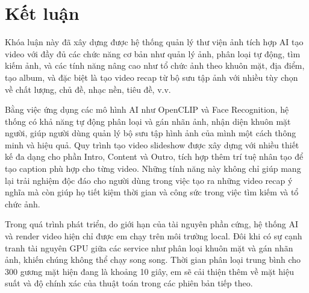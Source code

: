 \chapter*{Kết luận}

Khóa luận này đã xây dựng được hệ thống quản lý thư viện ảnh tích hợp AI tạo video với đầy đủ các chức năng cơ bản như quản lý ảnh, phân loại tự động, tìm kiếm ảnh, và các tính năng nâng cao như tổ chức ảnh theo khuôn mặt, địa điểm, tạo album, và đặc biệt là tạo video recap từ bộ sưu tập ảnh với nhiều tùy chọn về chất lượng, chủ đề, nhạc nền, tiêu đề, v.v.

Bằng việc ứng dụng các mô hình AI như OpenCLIP và Face Recognition, hệ thống có khả năng tự động phân loại và gán nhãn ảnh, nhận diện khuôn mặt người, giúp người dùng quản lý bộ sưu tập hình ảnh của mình một cách thông minh và hiệu quả. Quy trình tạo video slideshow được xây dựng với nhiều thiết kế đa dạng cho phần Intro, Content và Outro, tích hợp thêm trí tuệ nhân tạo để tạo caption phù hợp cho từng video. Những tính năng này không chỉ giúp mang lại trải nghiệm độc đáo cho người dùng trong việc tạo ra những video recap ý nghĩa mà còn giúp họ tiết kiệm thời gian và công sức trong việc tìm kiếm và tổ chức ảnh.

Trong quá trình phát triển, do giới hạn của tài nguyên phần cứng, hệ thống AI và render video hiện chỉ được em chạy trên môi trường local. Đôi khi có sự cạnh tranh tài nguyên GPU giữa các service như phân loại khuôn mặt và gán nhãn ảnh, khiến chúng không thể chạy song song. Thời gian phân loại trung bình cho 300 gương mặt hiện đang là khoảng 10 giây, em sẽ cải thiện thêm về mặt hiệu suất và độ chính xác của thuật toán trong các phiên bản tiếp theo.